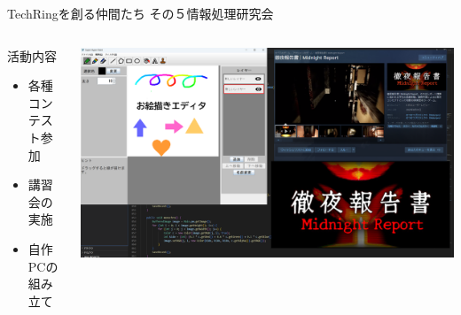 \documentclass[dvipdfmx]{beamer}
\begin{document}
\begin{frame}{TechRingを創る仲間たち その５}{情報処理研究会}
  
  \vspace{-2mm}

  \begin{columns}[totalwidth=\textwidth]
    \begin{column}{0.4\textwidth}
      \begin{block}{活動内容}
        \begin{itemize}
          \item 各種コンテスト参加
          \item 講習会の実施
          \item 自作PCの組み立て
        \end{itemize}
      \end{block}
    \end{column}
    \begin{column}{0.5\textwidth}
      \includegraphics[scale=.13]{pic/joken.png}
    \end{column}
  \end{columns}

  \vspace{-2mm}


\end{frame}
\end{document}
